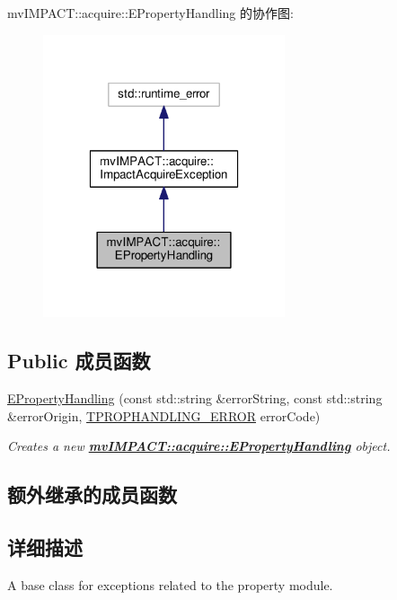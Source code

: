mv\+I\+M\+P\+A\+C\+T\+:\+:acquire\+:\+:E\+Property\+Handling 的协作图\+:
\nopagebreak
\begin{figure}[H]
\begin{center}
\leavevmode
\includegraphics[width=202pt]{classmv_i_m_p_a_c_t_1_1acquire_1_1_e_property_handling__coll__graph}
\end{center}
\end{figure}
\subsection*{Public 成员函数}
\begin{DoxyCompactItemize}
\item 
\hyperlink{classmv_i_m_p_a_c_t_1_1acquire_1_1_e_property_handling_ab3b7b140ea51e8ca394f0c4b3ae8568b}{E\+Property\+Handling} (const std\+::string \&error\+String, const std\+::string \&error\+Origin, \hyperlink{group___common_interface_ga61b0634ab285d9a2a303e0092167127e}{T\+P\+R\+O\+P\+H\+A\+N\+D\+L\+I\+N\+G\+\_\+\+E\+R\+R\+O\+R} error\+Code)
\begin{DoxyCompactList}\small\item\em Creates a new {\bfseries \hyperlink{classmv_i_m_p_a_c_t_1_1acquire_1_1_e_property_handling}{mv\+I\+M\+P\+A\+C\+T\+::acquire\+::\+E\+Property\+Handling}} object. \end{DoxyCompactList}\end{DoxyCompactItemize}
\subsection*{额外继承的成员函数}


\subsection{详细描述}
A base class for exceptions related to the property module. 

